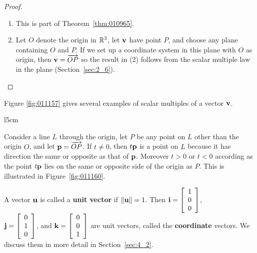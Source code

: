 \begin{proof}
\begin{enumerate}
\item This is part of Theorem~\ref{thm:010965}.

\item Let $O$ denote the origin in $\mathbb{R}^3$, let $\textbf{v}$ have point $P$, and choose any plane containing $O$ and $P$. If we set up a coordinate system in this plane with $O$ as origin, then $\textbf{v} = \overrightarrow{OP}$ so the result in (2) follows from the scalar multiple law in the plane (Section~\ref{sec:2_6}).
\end{enumerate}
\vspace*{-2em}\end{proof}


\noindent Figure \ref{fig:011157} gives several examples of scalar multiples of a vector $\textbf{v}$.


\begin{wrapfigure}[8]{l}{5cm}
\vspace{-1em} 
\centering

\caption{\label{fig:011157}}
\vspace{1em}

\caption{\label{fig:011160}}
\end{wrapfigure}

Consider a line $L$ through the origin, let $P$ be any point on $L$ other than the origin $O$, and let $\textbf{p} = \overrightarrow{OP}$. If $t \neq 0$, then $t\textbf{p}$ is a point on $L$ because it has direction the same or opposite as that of $\textbf{p}$. Moreover $t > 0$ or $t < 0$ according as the point $t\textbf{p}$ lies on the same or opposite side of the origin as $P$. This is illustrated in Figure~\ref{fig:011160}.

A vector $\textbf{u}$ is called a \textbf{unit vector} if $\| \textbf{u} \| = 1$. Then 
$\textbf{i} = \left[
\begin{array}{c}
1 \\
0 \\
0  
\end{array}
\right]$, 
\\ $\textbf{j} = \left[
\begin{array}{c}
0 \\
1 \\
0  
\end{array}
\right]$, and 
$\textbf{k} = \left[
\begin{array}{c}
0 \\
0 \\
1  
\end{array}
\right]$ 
are unit vectors, called the \textbf{coordinate} vectors. We discuss them in more detail in Section~\ref{sec:4_2}.

